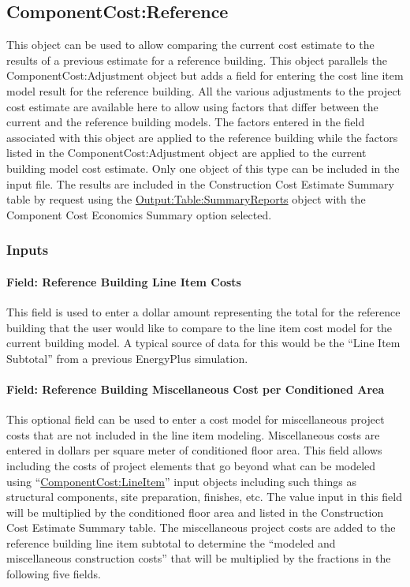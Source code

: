 \subsection{ComponentCost:Reference}\label{componentcostreference}

This object can be used to allow comparing the current cost estimate to the results of a previous estimate for a reference building. This object parallels the ComponentCost:Adjustment object but adds a field for entering the cost line item model result for the reference building. All the various adjustments to the project cost estimate are available here to allow using factors that differ between the current and the reference building models. The factors entered in the field associated with this object are applied to the reference building while the factors listed in the ComponentCost:Adjustment object are applied to the current building model cost estimate. Only one object of this type can be included in the input file. The results are included in the Construction Cost Estimate Summary table by request using the \hyperref[outputtablesummaryreports]{Output:Table:SummaryReports} object with the Component Cost Economics Summary option selected.

\subsubsection{Inputs}

\paragraph{Field: Reference Building Line Item Costs}\label{field-reference-building-line-item-costs}

This field is used to enter a dollar amount representing the total for the reference building that the user would like to compare to the line item cost model for the current building model. A typical source of data for this would be the ``Line Item Subtotal'' from a previous EnergyPlus simulation.

\paragraph{Field: Reference Building Miscellaneous Cost per Conditioned Area}\label{field-reference-building-miscellaneous-cost-per-conditioned-area}

This optional field can be used to enter a cost model for miscellaneous project costs that are not included in the line item modeling. Miscellaneous costs are entered in dollars per square meter of conditioned floor area. This field allows including the costs of project elements that go beyond what can be modeled using ``\hyperref[componentcostlineitem]{ComponentCost:LineItem}'' input objects including such things as structural components, site preparation, finishes, etc. The value input in this field will be multiplied by the conditioned floor area and listed in the Construction Cost Estimate Summary table. The miscellaneous project costs are added to the reference building line item subtotal to determine the ``modeled and miscellaneous construction costs'' that will be multiplied by the fractions in the following five fields.

